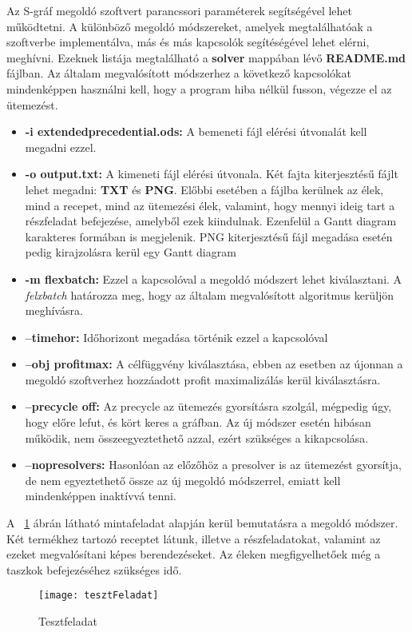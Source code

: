 Az S-gráf megoldó szoftvert parancssori paraméterek segítségével lehet működtetni. A különböző megoldó módszereket, amelyek megtalálhatóak a szoftverbe implementálva, más és más kapcsolók segítéségével lehet elérni, meghívni. Ezeknek listája megtalálható a \textbf{solver} mappában lévő \textbf{README.md} fájlban. Az általam megvalósított módszerhez a következő kapcsolókat mindenképpen használni kell, hogy a program hiba nélkül fusson, végezze el az ütemezést.
\begin{itemize}
	\item \textbf{-i extended\textunderscore precedential.ods:} A bemeneti fájl elérési útvonalát kell megadni ezzel.
	\item \textbf{-o output.txt:} A kimeneti fájl elérési útvonala. Két fajta kiterjesztésű fájlt lehet megadni: \textbf{TXT} és \textbf{PNG}. Előbbi esetében a fájlba kerülnek az élek, mind a recepet, mind az ütemezési élek, valamint, hogy mennyi ideig tart a részfeladat befejezése, amelyből ezek kiindulnak. Ezenfelül a Gantt diagram karakteres formában is megjelenik. PNG kiterjesztésű fájl megadása esetén pedig kirajzolásra kerül egy Gantt diagram
	\item \textbf{-m flexbatch:} Ezzel a kapcsolóval a megoldó módszert lehet kiválasztani. A \textit{felxbatch} határozza meg, hogy az általam megvalósított algoritmus kerüljön meghívásra.
	\item \textbf{--timehor:} Időhorizont megadása történik ezzel a kapcsolóval
	\item \textbf{--obj profit\textunderscore max:} A célfüggvény kiválasztása, ebben az esetben az újonnan a megoldó szoftverhez hozzáadott profit maximalizálás kerül kiválasztásra.
	\item \textbf{--precycle off:} Az precycle az ütemezés gyorsításra szolgál, mégpedig úgy, hogy előre lefut, és kört keres a gráfban. Az új módszer esetén hibásan működik, nem összeegyeztethető azzal, ezért szükséges a kikapcsolása.
	\item \textbf{--nopresolvers:} Hasonlóan az előzőhöz a presolver is az ütemezést gyorsítja, de nem egyeztethető össze az új megoldó módszerrel, emiatt kell mindenképpen inaktívvá tenni.
\end{itemize}

A ~\ref{tesztFeladat} ábrán látható mintafeladat alapján kerül bemutatásra a megoldó módszer. Két termékhez tartozó receptet látunk, illetve a részfeladatokat, valamint az ezeket megvalósítani képes berendezéseket. Az éleken megfigyelhetőek még a taszkok befejezéséhez szükséges idő.
\begin{figure}[H]
\begin{center}
\texttt{[image: tesztFeladat]}
\caption{Tesztfeladat}
\label{tesztFeladat}
\end{center}
\end{figure}

